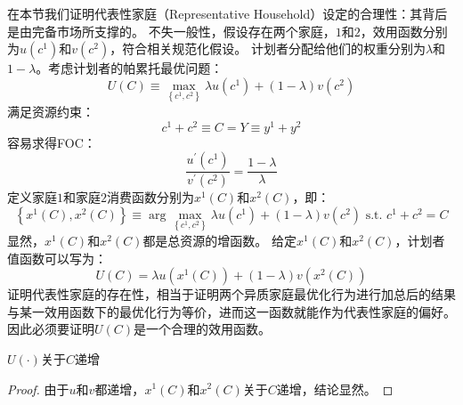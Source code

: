在本节我们证明代表性家庭（Representative Household）设定的合理性：其背后是由完备市场所支撑的。
不失一般性，假设存在两个家庭，$1$和$2$，效用函数分别为$u\left(c^1\right)$和$v\left(c^2\right)$，符合相关规范化假设。
计划者分配给他们的权重分别为$\lambda$和$1-\lambda$。考虑计划者的帕累托最优问题：
\begin{equation}
    U(C) \equiv \max _{\left\{c^1, c^2\right\}} \lambda u\left(c^1\right)+(1-\lambda) v\left(c^2\right)
\end{equation}
满足资源约束：
\begin{equation}
    c^1+c^2 \equiv C = Y \equiv y^1 + y^2
\end{equation}
容易求得FOC：
\begin{equation}
    \frac{u^{\prime}\left(c^1\right)}{v^{\prime}\left(c^2\right)} = \frac{1-\lambda}{\lambda}
\end{equation}
定义家庭$1$和家庭$2$消费函数分别为$x^1\left(C\right)$和$x^2\left(C\right)$，即：
\begin{equation*}
    \left\{x^1(C), x^2(C)\right\} 
        \equiv \arg\max_{\left\{c^1, c^2\right\}} \lambda u\left(c^1\right)+(1-\lambda) v\left(c^2\right) \text { s.t. } c^1+c^2=C
\end{equation*}
显然，$x^1\left(C\right)$和$x^2\left(C\right)$都是总资源的增函数。
给定$x^1\left(C\right)$和$x^2\left(C\right)$，计划者值函数可以写为：
\begin{equation}    \label{eq-u-h1h2}
    U\left(C\right)=\lambda u\left(x^1\left(C\right)\right)+\left(1-\lambda\right) v\left(x^2\left(C\right)\right)
\end{equation}
证明代表性家庭的存在性，相当于证明两个异质家庭最优化行为进行加总后的结果与某一效用函数下的最优化行为等价，进而这一函数就能作为代表性家庭的偏好。
因此必须要证明$U\left(C\right)$是一个合理的效用函数。
\begin{property}
    $U\left(\cdot\right)$关于$C$递增
\end{property}
\begin{proof}
    由于$u$和$v$都递增，$x^1\left(C\right)$和$x^2\left(C\right)$关于$C$递增，结论显然。
\end{proof}

